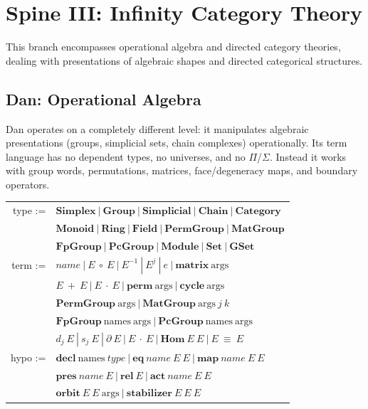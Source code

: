 \documentclass{article}
\theoremstyle{definition}
\theoremstyle{plain}
\begin{document}
\newpage
\section{Spine III: Infinity Category Theory}
This branch encompasses operational algebra and directed category theories, dealing with presentations of algebraic shapes and directed categorical structures.

\subsection{Dan: Operational Algebra}
Dan operates on a completely different level: it manipulates algebraic
presentations (groups, simplicial sets, chain complexes) operationally.
Its term language has no dependent types, no universes, and no $\Pi$/$\Sigma$.
Instead it works with group words, permutations, matrices, face/degeneracy
maps, and boundary operators.

\begin{table}[ht!]
\centering
\begin{tabular}{rl}
    type :=&$\textbf{Simplex}\ |\ \textbf{Group}\ |\ \textbf{Simplicial}\ |\ \textbf{Chain}\ |\ \textbf{Category}$ \\
         &$\textbf{Monoid}\ |\ \textbf{Ring}\ |\ \textbf{Field}\ |\ \textbf{PermGroup}\ |\ \textbf{MatGroup}$ \\
         &$\textbf{FpGroup}\ |\ \textbf{PcGroup}\ |\ \textbf{Module}\ |\ \textbf{Set}\ |\ \textbf{GSet}$ \\
    term :=&$name\ |\ E\ \circ\ E\ |\ E^{-1}\ |\ E^j\ |\ e\ |\ \textbf{matrix}\ \textrm{args}$ \\
         &$E\ +\ E\ |\ E\ \cdot\ E\ |\ \textbf{perm}\ \textrm{args}\ |\ \textbf{cycle}\ \textrm{args}$ \\
         &$\textbf{PermGroup}\ \textrm{args}\ |\ \textbf{MatGroup}\ \textrm{args}\ j\ k$ \\
         &$\textbf{FpGroup}\ \textrm{names}\ \textrm{args}\ |\ \textbf{PcGroup}\ \textrm{names}\ \textrm{args}$ \\
         &$d_j\ E\ |\ s_j\ E\ |\ \partial\ E\ |\ E\ \cdot\ E\ |\ \textbf{Hom}\ E\ E\ |\ E\ \equiv\ E$ \\
    hypo :=&$\textbf{decl}\ \textrm{names}\ type\ |\ \textbf{eq}\ name\ E\ E\ |\ \textbf{map}\ name\ E\ E$ \\
         &$\textbf{pres}\ name\ E\ |\ \textbf{rel}\ E\ |\ \textbf{act}\ name\ E\ E$ \\
         &$\textbf{orbit}\ E\ E\ \textrm{args}\ |\ \textbf{stabilizer}\ E\ E\ E$ \\
\end{tabular}
\end{table}
\end{document}
